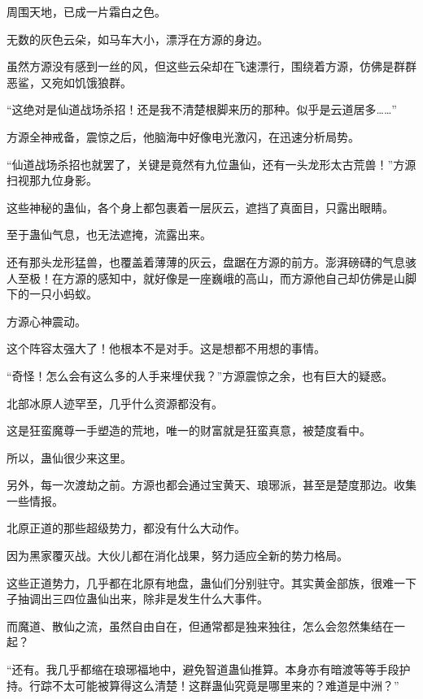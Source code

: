 
\begin{this_body}



周围天地，已成一片霜白之色。

无数的灰色云朵，如马车大小，漂浮在方源的身边。

虽然方源没有感到一丝的风，但这些云朵却在飞速漂行，围绕着方源，仿佛是群群恶鲨，又宛如饥饿狼群。

“这绝对是仙道战场杀招！还是我不清楚根脚来历的那种。似乎是云道居多……”

方源全神戒备，震惊之后，他脑海中好像电光激闪，在迅速分析局势。

“仙道战场杀招也就罢了，关键是竟然有九位蛊仙，还有一头龙形太古荒兽！”方源扫视那九位身影。

这些神秘的蛊仙，各个身上都包裹着一层灰云，遮挡了真面目，只露出眼睛。

至于蛊仙气息，也无法遮掩，流露出来。

还有那头龙形猛兽，也覆盖着薄薄的灰云，盘踞在方源的前方。澎湃磅礴的气息骇人至极！在方源的感知中，就好像是一座巍峨的高山，而方源他自己却仿佛是山脚下的一只小蚂蚁。

方源心神震动。

这个阵容太强大了！他根本不是对手。这是想都不用想的事情。

“奇怪！怎么会有这么多的人手来埋伏我？”方源震惊之余，也有巨大的疑惑。

北部冰原人迹罕至，几乎什么资源都没有。

这是狂蛮魔尊一手塑造的荒地，唯一的财富就是狂蛮真意，被楚度看中。

所以，蛊仙很少来这里。

另外，每一次渡劫之前。方源也都会通过宝黄天、琅琊派，甚至是楚度那边。收集一些情报。

北原正道的那些超级势力，都没有什么大动作。

因为黑家覆灭战。大伙儿都在消化战果，努力适应全新的势力格局。

这些正道势力，几乎都在北原有地盘，蛊仙们分别驻守。其实黄金部族，很难一下子抽调出三四位蛊仙出来，除非是发生什么大事件。

而魔道、散仙之流，虽然自由自在，但通常都是独来独往，怎么会忽然集结在一起？

“还有。我几乎都缩在琅琊福地中，避免智道蛊仙推算。本身亦有暗渡等等手段护持。行踪不太可能被算得这么清楚！这群蛊仙究竟是哪里来的？难道是中洲？”


\end{this_body}
